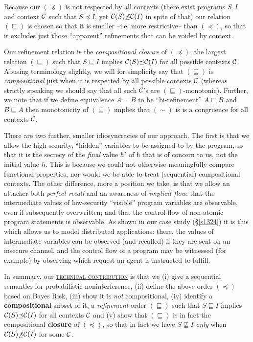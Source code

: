 \documentclass[runningheads]{llncs}
\newcommand\Vh {\mathsf{h}}
\newcommand\Sec[1] {Sec.~\ref{#1}}
\renewcommand\Sec[1] {\S\ref{#1}}
\newcommand\CC {{\cal C}}
\newcommand\Ref {\mathrel{\sqsubseteq}}
\newcommand\NotRef {\mathrel{\not\sqsubseteq}}
\newcommand\ERef {\mathrel{\preceq}}
\newcommand\NotERef {\mathrel{\not\preceq}}
\begin{document}
Because our $(\ERef)$ is not respected by all contexts (there exist programs $S,I$ and context $\CC$ such that $S{\ERef}I$, yet $\CC(S){\NotERef}\CC(I)$ in spite of that) our relation $(\Ref)$ is chosen so that it is smaller --i.e. more restrictive-- than $(\ERef)$, so that it excludes just those ``apparent'' refinements that can be voided by context.

Our refinement relation is the \emph{compositional closure} of $(\ERef)$, the largest relation $(\Ref)$ such that $S {\Ref}I$ implies $\CC(S){\ERef}\CC(I)$ for all possible contexts $\CC$. Abusing terminology slightly, we will for simplicity say that $(\Ref)$ is \emph{compositional} just when it is respected by all possible contexts $\CC$ (whereas strictly speaking we should say that all such $\CC$'s are $(\Ref)$-monotonic). Further, we note that if we define equivalence $A{\sim}B$ to be ``bi-refinement'' $A{\Ref}B$ and $B{\Ref}A$ then monotonicity of $(\Ref)$ implies that $(\sim)$ is is a congruence for all contexts $\CC$.

There are two further, smaller idiosyncracies of our approach. The first is that we allow the high-security, ``hidden'' variables to be assigned-to by the program, so that it is the secrecy of the \emph{final} value $h'$ of $\Vh$ that is of concern to us, not the initial value $h$. This is because we could not otherwise meaningfully compare functional properties, nor would we be able to treat (sequential) compositional contexts. The other difference, more a position we take, is that we allow an attacker both \emph{perfect recall} and an awareness of \emph{implicit flow}: that the intermediate values of low-security ``visible'' program variables are observable, even if subsequently overwritten; and that the control-flow of non-atomic program statements is observable. 
As shown in our case study (\Sec{s1324}) it is this which allows us to model distributed applications: there, the values of intermediate variables can be observed (and recalled) if they are sent on an insecure channel, and the control flow of a program may be witnessed (for example) by observing which 
request an agent is instructed to fulfill.

\smallskip
In summary, our \underline{\textsc{technical contribution}} is that we (i) give a sequential semantics for probabilistic noninterference, (ii) define the above order $(\ERef)$ based on Bayes Risk, (iii) show it is \emph{not} compositional, (iv) identify a \textbf{compositional} subset of it, a \emph{refinement} order $(\Ref)$ such that $S{\Ref}I$ implies $\CC(S){\ERef}\CC(I)$ for all contexts $\CC$ and (v) show that $({\Ref})$ is in fact the compositional \textbf{closure} of $(\ERef)$, so that in fact we have $S{\NotRef}I$ \emph{only} when $\CC(S){\NotERef}\CC(I)$ for some $\CC$.
\end{document}
